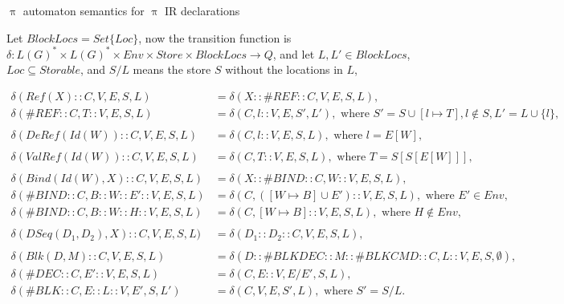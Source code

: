 \documentclass{beamer}
\begin{document}
\begin{frame}{{\color{red}$\uppi$ automaton} semantics for {\color{red}$\uppi$ IR} declarations}

Let $\mathit{BlockLocs} = \mathit{Set}\{\mathit{Loc}\}$, now the transition function is $\delta : L(G)^* \times L(G)^* \times Env \times Store \times \mathit{BlockLocs} \to Q$, and let $L, L' \in \mathit{BlockLocs}$, $\mathit{Loc} \subseteq \mathit{Storable}$, and $S / L$ means the store $S$ without the locations in $L$,

\begin{tiny}
\begin{align}
\delta(Ref(X) :: C, V, E, S, L) & = \delta(X :: \#REF :: C, V, E, S, L), \\
\delta(\#REF :: C, T :: V, E, S, L) & = \delta(C, l :: V, E, S', L'), \text{ where } S' = S \cup [l \mapsto T], l \not\in S, L' = L \cup \{l\}, \\ \nonumber \\
\delta(DeRef(Id(W)) :: C, V, E, S, L) & = \delta(C, l :: V, E, S, L), \text{ where } l = E[W],  \\ \nonumber \\
\delta(ValRef(Id(W)) :: C, V, E, S, L) & = \delta(C, T :: V, E, S, L), \text{ where } T = S[S[E[W]]],  \\ \nonumber \\
\delta(Bind(Id(W), X) :: C, V, E, S, L) &= \delta(X :: \#BIND :: C, W :: V, E, S, L), \\
\delta(\#BIND :: C, B :: W :: E' :: V, E, S, L) &= \delta(C, ([W \mapsto B] \cup E') :: V, E, S, L), \text{ where } E' \in \mathit{Env},\\
\delta(\#BIND :: C, B :: W :: H :: V, E, S, L) &= \delta(C, [W \mapsto B] :: V, E, S, L), \text{ where } H \not\in \mathit{Env},  \\ \nonumber \\
\delta(DSeq(D_1, D_2), X) :: C, V, E, S, L) &= \delta(D_1 :: D_2 :: C, V, E, S, L), \\ \nonumber \\
\delta(Blk(D, M) :: C, V, E, S, L) &= \delta(D :: \#BLKDEC :: M :: \#BLKCMD :: C, L :: V, E, S, \emptyset), \\
\delta(\#DEC :: C, E' :: V, E, S, L) &= \delta(C, E :: V, E / E', S, L), \\
\delta(\#BLK :: C, E :: L :: V, E', S, L') &= \delta(C, V, E, S', L), \text{ where } S' = S / L.
\end{align}
\end{tiny}

\end{frame}
\end{document}
